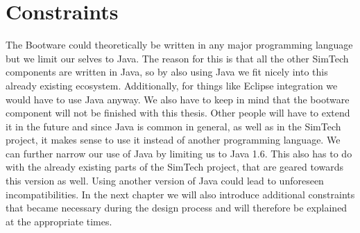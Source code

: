 \section{Constraints}

The Bootware could theoretically be written in any major programming language but we limit our selves to Java.
The reason for this is that all the other SimTech components are written in Java, so by also using Java we fit nicely into this already existing ecosystem.
Additionally, for things like Eclipse integration we would have to use Java anyway.
We also have to keep in mind that the bootware component will not be finished with this thesis.
Other people will have to extend it in the future and since Java is common in general, as well as in the SimTech project, it makes sense to use it instead of another programming language.
We can further narrow our use of Java by limiting us to Java 1.6.
This also has to do with the already existing parts of the SimTech project, that are geared towards this version as well.
Using another version of Java could lead to unforeseen incompatibilities.
In the next chapter we will also introduce additional constraints that became necessary during the design process and will therefore be explained at the appropriate times.
